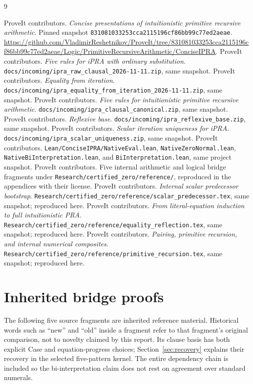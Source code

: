 \documentclass[11pt]{article}
\theoremstyle{definition}
\DeclareRobustCommand{\file}[1]{\nolinkurl{#1}}
\begin{document}
\begin{thebibliography}{9}
\small\raggedright
{} ProveIt contributors. \emph{Concise presentations of
intuitionistic primitive recursive arithmetic}. Pinned snapshot
\texttt{831081033253cca2115196cf86bb99c77ed2aeae}.
\url{https://github.com/VladimirReshetnikov/ProveIt/tree/831081033253cca2115196cf86bb99c77ed2aeae/Logic/PrimitiveRecursiveArithmetic/ConciseIPRA}.
 ProveIt contributors. \emph{Five rules for iPRA with ordinary
substitution}. \file{docs/incoming/ipra_raw_clausal_2026-11-11.zip}, same snapshot.
 ProveIt contributors. \emph{Equality from iteration}.
\file{docs/incoming/ipra_equality_from_iteration_2026-11-11.zip}, same snapshot.
 ProveIt contributors. \emph{Five rules for intuitionistic
primitive recursive arithmetic}. \file{docs/incoming/ipra_clausal_canonical.zip}, same snapshot.
 ProveIt contributors. \emph{Reflexive base}.
\file{docs/incoming/ipra_reflexive_base.zip}, same snapshot.
 ProveIt contributors. \emph{Scalar iteration uniqueness for
iPRA}. \file{docs/incoming/ipra_scalar_uniqueness.zip}, same snapshot.
 ProveIt contributors. \file{Lean/ConciseIPRA/NativeEval.lean},
\file{NativeZeroNormal.lean}, \file{NativeBiInterpretation.lean},
and \file{BiInterpretation.lean}, same project snapshot.
 ProveIt contributors. Five internal arithmetic and logical
bridge fragments under \file{Research/certified_zero/reference/},
reproduced in the appendices with their license.
 ProveIt contributors. \emph{Internal scalar predecessor
bootstrap}. \file{Research/certified_zero/reference/scalar_predecessor.tex},
same snapshot; reproduced here.
 ProveIt contributors. \emph{From literal-equation induction
to full intuitionistic PRA}.
\file{Research/certified_zero/reference/equality_reflection.tex},
same snapshot; reproduced here.
 ProveIt contributors. \emph{Pairing, primitive recursion,
and internal numerical composites}.
\file{Research/certified_zero/reference/primitive_recursion.tex},
same snapshot; reproduced here.
\end{thebibliography}

\clearpage
\appendix
\part*{Inherited bridge proofs}
The following five source fragments are inherited reference material.
Historical words such as ``new'' and ``old'' inside a fragment refer to
that fragment's original comparison, not to novelty claimed by this
report. Its clause basis has both explicit Case and equation-progress
choices; Section~\ref{sec:recovery} explains their recovery in the selected
five-pattern kernel. The entire dependency chain is included so the
bi-interpretation claim does not rest on agreement over standard numerals.
\end{document}
